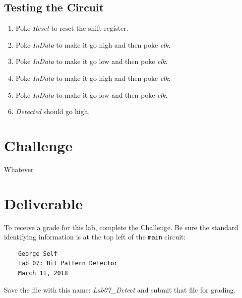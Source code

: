 \subsection{Testing the Circuit}

\begin{enumerate}
	\item Poke \textit{Reset} to reset the shift register.
	\item Poke \textit{InData} to make it go high and then poke \textit{clk}.
	\item Poke \textit{InData} to make it go low and then poke \textit{clk}.
	\item Poke \textit{InData} to make it go high and then poke \textit{clk}.
	\item Poke \textit{InData} to make it go low and then poke \textit{clk}.
	\item \textit{Detected} should go high.
\end{enumerate}


\section{Challenge}

Whatever

\section{Deliverable}

To receive a grade for this lab, complete the Challenge. Be sure the standard identifying information is at the top left of the \lstinline{main} circuit: 

\bigskip
\begin{minipage}{\linewidth}
	\begin{verbatim}
	George Self
	Lab 07: Bit Pattern Detector
	March 11, 2018
	\end{verbatim}
\end{minipage}
\bigskip

Save the file with this name: \textit{Lab07\_Detect} and submit that file for grading.


